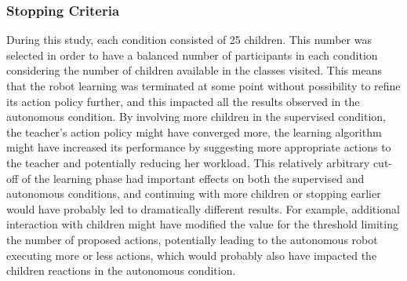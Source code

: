 
\subsubsection{Stopping Criteria}

During this study, each condition consisted of 25 children. This number was selected in order to have a balanced number of participants in each condition considering the number of  children available in the classes visited. This means that the robot learning was terminated at some point without possibility to refine its action policy further, and this impacted all the results observed in the autonomous condition. By involving more children in the supervised condition, the teacher's action policy might have converged more, the learning algorithm might have increased its performance by suggesting more appropriate actions to the teacher and potentially reducing her workload. This relatively arbitrary cut-off of the learning phase had important effects on both the supervised and autonomous conditions, and continuing with more children or stopping earlier would have probably led to dramatically different results. For example, additional interaction with children might have modified the value for the threshold limiting the number of proposed actions, potentially leading to the autonomous robot executing more or less actions, which would probably also have impacted the children reactions in the autonomous condition.

